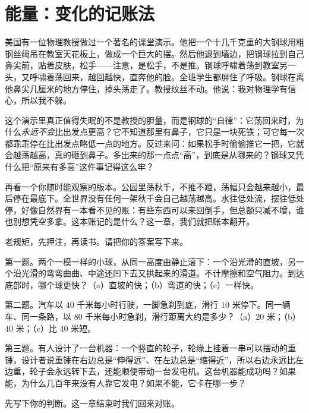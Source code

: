 \chapter{能量：变化的记账法}


\begin{mainline}
美国有一位物理教授做过一个著名的课堂演示。他把一个十几千克重的大钢球用粗钢丝绳吊在教室天花板上，做成一个巨大的摆。然后他退到墙边，把钢球拉到自己鼻尖前，贴着皮肤，松手——注意，是松手，不是推。钢球呼啸着荡到教室另一头，又呼啸着荡回来，越回越快，直奔他的脸。全班学生都屏住了呼吸。钢球在离他鼻尖几厘米的地方停住，掉头荡走了。教授纹丝不动。他说：我对物理学有信心，所以我不躲。

这个演示里真正值得失眠的不是教授的胆量，而是钢球的“自律”：它荡回来时，为什么\emph{永远不会}比出发点更高？它不知道那里有鼻子，它只是一块死铁；可它每一次都乖乖停在比出发点略低一点的地方。反过来问：如果松手时偷偷推它一把，它就会越荡越高，真的砸到鼻子。多出来的那一点点“高”，到底是从哪来的？钢球又凭什么把“原来有多高”这件事记得这么牢？

再看一个你随时能观察的版本。公园里荡秋千，不推不蹬，荡幅只会越来越小，最后停在最底下。全世界没有任何一架秋千会自己越荡越高。水往低处流，摆往低处停，好像自然界有一本看不见的账：有些东西可以来回倒手，但总额只减不增，谁也别想凭空多拿。这本账记的是什么？这一章，我们就把账本翻开。
\end{mainline}


老规矩，先押注，再读书。请把你的答案写下来。

第一题。两个一模一样的小球，从同一高度由静止滚下：一个沿光滑的直坡，另一个沿光滑的弯弯曲曲、中途还凹下去又拱起来的滑道。不计摩擦和空气阻力。到达底部时，哪个球更快？（a）直坡的快；（b）弯道的快；（c）一样快。

第二题。汽车以 \(40\) 千米每小时行驶，一脚急刹到底，滑行 \(10\) 米停下。同一辆车、同一条路，以 \(80\) 千米每小时急刹，滑行距离大约是多少？（a）\(20\) 米；（b）\(40\) 米；（c）比 \(40\) 米短。

第三题。有人设计了一台机器：一个竖直的轮子，轮缘上挂着一串可以摆动的重锤，设计者说重锤在右边总是“伸得远”、在左边总是“缩得近”，所以右边永远比左边重，轮子会永远转下去，还能顺便带动一台发电机。这台机器能成功吗？如果能，为什么几百年来没有人靠它发电？如果不能，它卡在哪一步？

先写下你的判断。这一章结束时我们回来对账。


